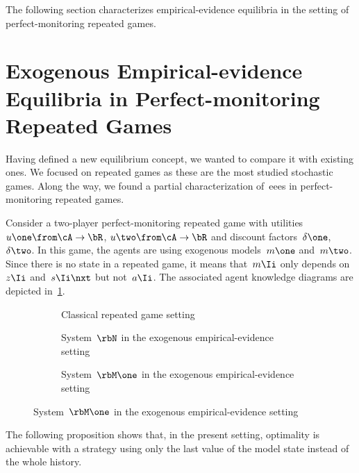 The following section characterizes empirical-evidence equilibria in the setting of perfect-monitoring repeated games.

\section[xEEEs in Perfect-monitoring Repeated Games]{Exogenous Empirical-evidence Equilibria in Perfect-monitoring Repeated Games}

Having defined a new equilibrium concept, we wanted to compare it with existing ones.
We focused on repeated games as these are the most studied stochastic games.
Along the way, we found a partial characterization of~\acp{eee} in perfect-monitoring repeated games.

Consider a two-player perfect-monitoring repeated game with utilities \(u\one \from \cA \to \bR\), \(u\two \from \cA \to \bR\) and discount factors~\(\delta\one\),~\(\delta\two\).
In this game, the agents are using exogenous models~\(m\one\) and~\(m\two\).
Since there is no state in a repeated game, it means that~\(m\Ii\) only depends on~\(z\Ii\) and~\(s\Ii\nxt\) but not~\(a\Ii\).
The associated agent knowledge diagrams are depicted in~\cref{fig:initial}.

\begin{figure}[pht]
\centering
\begin{subfigure}{\textwidth}
\centering
{}
\caption{Classical repeated game setting}
\end{subfigure}%
\vspace{40pt}
\begin{subfigure}{\textwidth}
\centering
{}
\caption{System~\(\rbN\) in the exogenous empirical-evidence setting}
\end{subfigure}%
\vspace{40pt}
\begin{subfigure}{\textwidth}
\centering
{}
\caption{System~\(\rbM\one\) in the exogenous empirical-evidence setting}
\end{subfigure}%
\vspace{40pt}
\label{fig:initial}
\end{figure}

The following proposition shows that, in the present setting, optimality is achievable with a strategy using only the last value of the model state instead of the whole history.

